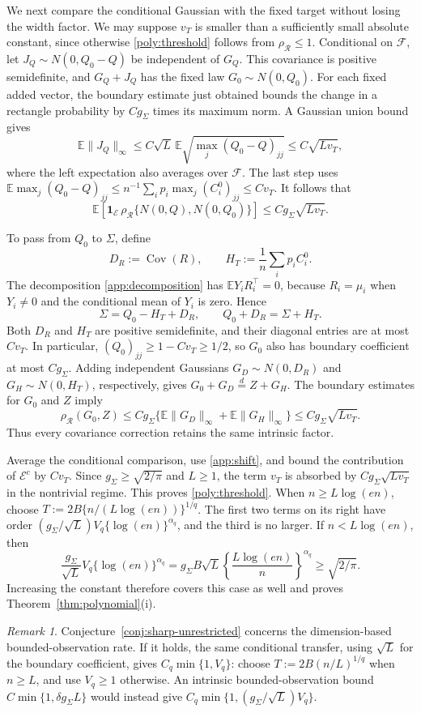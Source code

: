 \documentclass[11pt,letterpaper]{article}
\newenvironment{vSixBlock}{\color{magenta}}{}
\theoremstyle{remark}
\newtheorem{remark}{Remark}
\newcommand{\E}{\mathbb E}
\newcommand{\Cov}{\operatorname{Cov}}
\newcommand{\rh}{\rho_{\mathcal R}}
\newcommand{\ind}{\mathbf 1}
\begin{document}
\begin{vSixBlock}
We next compare the conditional Gaussian with the fixed target
without losing the width factor. We may suppose \(v_T\) is smaller
than a sufficiently small absolute constant, since otherwise
\eqref{poly:threshold} follows from \(\rh\le1\).
Conditional on \(\mathcal F\), let \(J_Q\sim N(0,Q_0-Q)\) be
independent of \(G_Q\). This covariance is positive semidefinite,
and \(G_Q+J_Q\) has the fixed law \(G_0\sim N(0,Q_0)\).
For each fixed added vector, the boundary estimate just obtained
bounds the change in a rectangle probability by
\(Cg_\Sigma\) times its maximum norm. A Gaussian union bound gives
\[
 \E\|J_Q\|_\infty
 \le C\sqrt L\,\E\sqrt{\max_j(Q_0-Q)_{jj}}
 \le C\sqrt{Lv_T},
\]
where the left expectation also averages over \(\mathcal F\).
The last step uses
\(\E\max_j(Q_0-Q)_{jj}\le n^{-1}\sum_i p_i\max_j(C_i^0)_{jj}
\le Cv_T\).
It follows that
\[
 \E\!\left[\ind_{\mathcal E}\,
     \rh\{N(0,Q),N(0,Q_0)\}\right]\le Cg_\Sigma\sqrt{Lv_T}.
\]

To pass from \(Q_0\) to \(\Sigma\), define
\[
 D_R:=\Cov(R),\qquad H_T:=\frac1n\sum_i p_iC_i^0.
\]
The decomposition \eqref{app:decomposition} has
\(\E Y_iR_i^\top=0\), because \(R_i=\mu_i\) when \(Y_i\ne0\)
and the conditional mean of \(Y_i\) is zero. Hence
\[
 \Sigma=Q_0-H_T+D_R,\qquad Q_0+D_R=\Sigma+H_T.
\]
Both \(D_R\) and \(H_T\) are positive semidefinite, and their
diagonal entries are at most \(Cv_T\).
In particular, \((Q_0)_{jj}\ge1-Cv_T\ge1/2\), so
\(G_0\) also has boundary coefficient at most \(Cg_\Sigma\).
Adding independent Gaussians \(G_D\sim N(0,D_R)\) and
\(G_H\sim N(0,H_T)\), respectively, gives
\(G_0+G_D\stackrel{d}=Z+G_H\).
The boundary estimates for \(G_0\) and \(Z\) imply
\[
 \rh(G_0,Z)
 \le Cg_\Sigma\{\E\|G_D\|_\infty+\E\|G_H\|_\infty\}
 \le Cg_\Sigma\sqrt{Lv_T}.
\]
Thus every covariance correction retains the same intrinsic factor.

Average the conditional comparison, use \eqref{app:shift}, and
bound the contribution of \(\mathcal E^c\) by \(Cv_T\).
Since \(g_\Sigma\ge\sqrt{2/\pi}\) and \(L\ge1\), the term \(v_T\)
is absorbed by \(Cg_\Sigma\sqrt{Lv_T}\) in the nontrivial regime.
This proves \eqref{poly:threshold}.
When \(n\ge L\log(en)\), choose
\(T:=2B\{n/(L\log(en))\}^{1/q}\). The first two terms on its
right have order
\((g_\Sigma/\sqrt L)V_q\{\log(en)\}^{\alpha_q}\),
and the third is no larger. If \(n<L\log(en)\), then
\[
 \frac{g_\Sigma}{\sqrt L}V_q\{\log(en)\}^{\alpha_q}
 =g_\Sigma B\sqrt L\left\{\frac{L\log(en)}n\right\}^{\alpha_q}
 \ge\sqrt{2/\pi}.
\]
Increasing the constant therefore covers this case as well and
proves Theorem~\ref{thm:polynomial}\textup{(i)}.

\begin{remark}\label{rmk:E1}
Conjecture~\ref{conj:sharp-unrestricted} concerns the dimension-based
bounded-observation rate. If it holds, the same conditional transfer,
using \(\sqrt L\) for the boundary coefficient, gives
\(C_q\min\{1,V_q\}\): choose \(T:=2B(n/L)^{1/q}\) when \(n\ge L\),
and use \(V_q\ge1\) otherwise. An intrinsic bounded-observation bound
\(C\min\{1,\delta g_\Sigma L\}\) would instead give
\(C_q\min\{1,(g_\Sigma/\sqrt L)V_q\}\).
\end{remark}
\end{vSixBlock}
\end{document}
